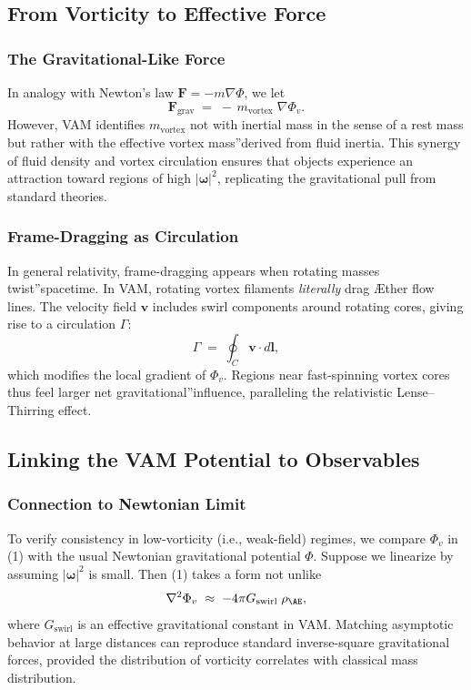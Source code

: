 \documentclass[a4paper,12pt]{article}
\begin{document}
\subsection{From Vorticity to Effective Force}
\subsubsection{The Gravitational-Like Force}

In analogy with Newton's law \(\mathbf{F} = -m \nabla \Phi\), we let
\[
    \mathbf{F}_{\mathrm{grav}} \;=\; -\,m_{\mathrm{vortex}}\;\nabla \Phi_v.
\]
However, VAM identifies \(m_{\mathrm{vortex}}\) not with inertial mass in the sense of a rest mass but rather with the effective vortex \grqq mass\textquotedblright derived from fluid inertia. This synergy of fluid density and vortex circulation ensures that objects experience an attraction toward regions of high \(\lvert \boldsymbol{\omega} \rvert^2\), replicating the gravitational pull from standard theories.

\subsubsection{Frame-Dragging as Circulation}

In general relativity, frame-dragging appears when rotating masses \grqq twist\textquotedblright spacetime. In VAM, rotating vortex filaments \textit{literally} drag Æther flow lines. The velocity field \(\mathbf{v}\) includes swirl components around rotating cores, giving rise to a circulation \(\Gamma\):
\[
    \Gamma \;=\; \oint_C \mathbf{v}\cdot d\mathbf{l},
\]
which modifies the local gradient of \(\Phi_v\). Regions near fast-spinning vortex cores thus feel larger net \grqq gravitational\textquotedblright influence, paralleling the relativistic Lense–Thirring effect.

\subsection{Linking the VAM Potential to Observables}

\subsubsection{Connection to Newtonian Limit}

To verify consistency in low-vorticity (i.e., weak-field) regimes, we compare \(\Phi_v\) in (1) with the usual Newtonian gravitational potential \(\Phi\). Suppose we linearize by assuming \(\lvert \boldsymbol{\omega} \rvert^2\) is small. Then (1) takes a form not unlike
\[
    \nabla^2 \Phi_v \;\approx\; -4\pi G_{\mathrm{swirl}}\;\rho_{\mathrm{\AE}},
\]
where \(G_{\mathrm{swirl}}\) is an effective gravitational constant in VAM. Matching asymptotic behavior at large distances can reproduce standard inverse-square gravitational forces, provided the distribution of vorticity correlates with classical mass distribution.
\end{document}
